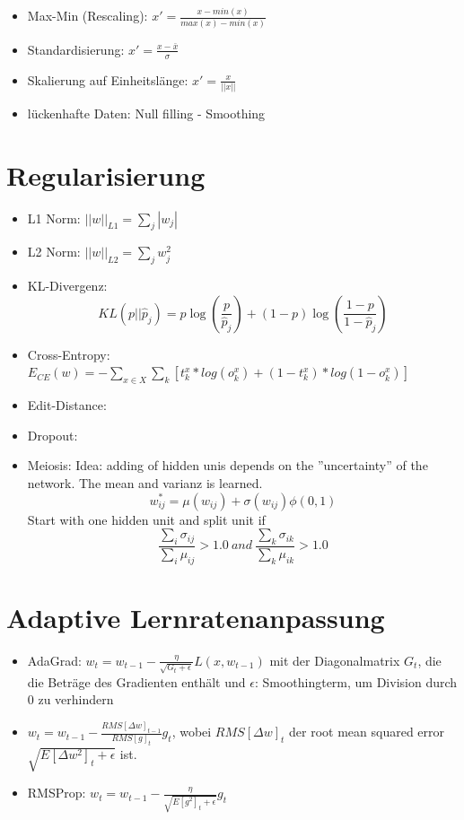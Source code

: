 \documentclass[paper=a4, fontsize=11pt]{scrartcl} %
\begin{document}
\begin{itemize}
\item Max-Min (Rescaling): $x' = \frac{x - min(x)}{max(x) - min(x)}$
\item Standardisierung: $x' = \frac{x - \bar{x}}{\sigma}$
\item Skalierung auf Einheitslänge: $x' = \frac{x}{||x||}$
\item lückenhafte Daten: Null filling - Smoothing
\end{itemize}

\section{Regularisierung}

\begin{itemize}
\item L1 Norm: $||w||_{L1} = \sum\limits_j |w_j|$
\item L2 Norm: $||w||_{L2} = \sum\limits_j w^2_j$
\item KL-Divergenz:
\[
KL(p || \widehat{p}_j) = p \log(\frac{p}{\widehat{p}_j}) + (1 - p) \log(\frac{1 - p}{1 - \widehat{p}_j})
\]
\item Cross-Entropy: $E_{CE}(w) = - \sum\limits_{x \in X} \sum\limits_k [t^x_k * log(o^x_k) + (1-t^x_k)*log(1-o^x_k)]$
\item Edit-Distance: 
\item Dropout: 
\item Meiosis: Idea: adding of hidden unis depends on the ''uncertainty'' of the network. The mean and varianz is learned.
\[
w_{ij}^{*} = \mu(w_{ij}) + \sigma(w_{ij}) \phi(0, 1)
\]
Start with one hidden unit and split unit if
\[
\frac{\sum_i \sigma_{ij}}{\sum_i \mu_{ij}} > 1.0 \: and \: \frac{\sum_k \sigma_{ik}}{\sum_k \mu_{ik}} > 1.0
\]
\end{itemize}

\section{Adaptive Lernratenanpassung}

\begin{itemize}
\item AdaGrad: $w_t = w_{t-1} - \frac{\eta}{\sqrt{G_t+\epsilon}} L(x,w_{t-1})$ mit der Diagonalmatrix $G_t$, die die Beträge des Gradienten enthält und $\epsilon$: Smoothingterm, um Division durch 0 zu verhindern
\item $w_t = w_{t-1} - \frac{RMS[\Delta w]_{t-1}}{RMS[g]_t}g_t$, wobei $RMS[\Delta w]_t$ der \glqq root mean squared error\grqq\ $\sqrt{E[\Delta w^2]_t + \epsilon}$ ist.
\item RMSProp: $w_t = w_{t-1} - \frac{\eta}{\sqrt{E[g^2]_t + \epsilon}} g_t$
\end{itemize}
\end{document}
